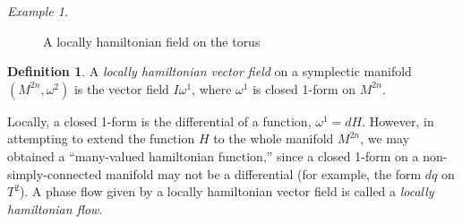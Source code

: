 \documentclass{book}
\numberwithin{equation}{section}
\theoremstyle{plain}
\theoremstyle{definition}
\newtheorem*{defn*}{Definition}
\theoremstyle{remark}
\theoremstyle{smallcap}
\newtheorem*{ex*}{Example}
\numberwithin{prob}{section}
\begin{document}
\begin{ex*}
\begin{figure}[h]
    \caption{A locally hamiltonian field on the torus}
  \end{figure}

\end{ex*}


\begin{defn*}
  A \emph{locally hamiltonian vector field}
  on a symplectic manifold $(M^{2n}, \omega^2)$
  is the vector field $I\omega^1$,
  where $\omega^1$ is closed 1-form on $M^{2n}$.
\end{defn*}

Locally, a closed 1-form is the differential of a function,
$\omega^1 = dH$.
However, in attempting to extend the function $H$
to the whole manifold $M^{2n}$,
we may obtained a ``many-valued hamiltonian function,''
since a closed 1-form on a non-simply-connected manifold
may not be a differential (for example, the form $dq$ on $T^2$).
%
A phase flow given by a locally hamiltonian vector field
is called a \emph{locally hamiltonian flow}.
\end{document}
